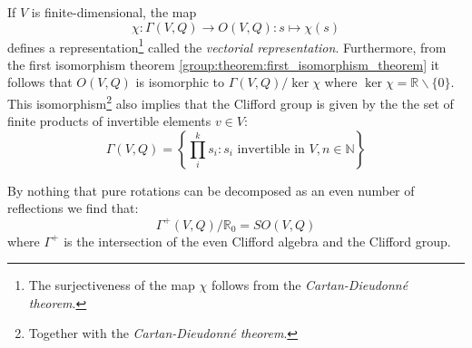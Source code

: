 	\begin{property}
		If $V$ is finite-dimensional, the map
		\begin{equation}
			\chi:\Gamma(V, Q)\rightarrow O(V, Q): s\mapsto\chi(s)
		\end{equation}
		defines a representation\footnote{The surjectiveness of the map $\chi$ follows from the \textit{Cartan-Dieudonn\'e theorem}.} called the \textit{vectorial representation}. Furthermore, from the first isomorphism theorem \ref{group:theorem:first_isomorphism_theorem} it follows that $O(V, Q)$ is isomorphic to $\Gamma(V, Q)/\ker\chi$ where $\ker\chi = \mathbb{R}\backslash\{0\}$. This isomorphism\footnote{Together with the \textit{Cartan-Dieudonn\'e theorem}.} also implies that the Clifford group is given by the the set of finite products of invertible elements $v\in V$:
		\begin{equation}
			\Gamma(V, Q) = \left\{\prod_i^ks_i : s_i\text{ invertible in }V, n\in\mathbb{N}\right\}
		\end{equation}
	\end{property}
	\begin{result}
		By nothing that pure rotations can be decomposed as an even number of reflections we find that:
		\begin{equation}
			\Gamma^+(V, Q)/\mathbb{R}_0 = SO(V, Q)
		\end{equation}
		where $\Gamma^+$ is the intersection of the even Clifford algebra and the Clifford group.
	\end{result}

